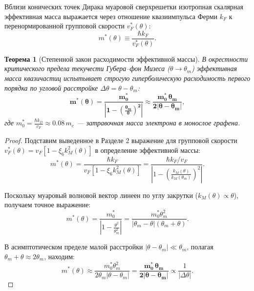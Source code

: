 \documentclass[12pt,a4paper]{article}
\newtheorem{theorem}{Теорема}
\begin{document}
Вблизи конических точек Дирака муаровой сверхрешетки изотропная скалярная эффективная масса выражается через отношение квазиимпульса Ферми $k_F$ к перенормированной групповой скорости $v_F^*(\theta)$:
\begin{equation}
	m^*(\theta) \equiv \frac{\hbar k_F}{v_F^*(\theta)}.
\end{equation}

\begin{theorem}[Степенной закон расходимости эффективной массы]
	В окрестности критического предела текучести Губера--фон Мизеса ($\theta \to \theta_m$) эффективная масса квазичастиц испытывает строгую гиперболическую расходимость первого порядка по угловой расстройке $\Delta \theta = \theta - \theta_m$:
	\begin{equation}
		\mathbf{m^*(\theta) = \frac{m_0^*}{\left| 1 - \left(\frac{\theta_m}{\theta}\right)^2 \right|} \approx \frac{m_0^* \, \theta_m}{2 |\theta - \theta_m|}},
	\end{equation}
	где $m_0^* = \frac{\hbar k_D}{v_F} \approx 0.08 \, m_e$ — затравочная масса электрона в монослое графена.
\end{theorem}

\begin{proof}
	Подставим выведенное в Разделе 2 выражение для групповой скорости $v_F^*(\theta) = v_F [1 - \xi_6 k_M^2(\theta)]$ в определение эффективной массы:
	\begin{equation}
		m^*(\theta) = \frac{\hbar k_F}{v_F \left[ 1 - \xi_6 k_M^2(\theta) \right]} = \frac{\hbar k_F / v_F}{\left| 1 - \left(\frac{k_M(\theta)}{k_M(\theta_m)}\right)^2 \right|}.
	\end{equation}
	
	Поскольку муаровый волновой вектор линеен по углу закрутки ($k_M(\theta) \propto \theta$), получаем точное выражение:
	\begin{equation}
		m^*(\theta) = \frac{m_0^*}{\left| 1 - \frac{\theta^2}{\theta_m^2} \right|} = \frac{m_0^* \theta_m^2}{|\theta_m - \theta|(\theta_m + \theta)}.
	\end{equation}
	
	В асимптотическом пределе малой расстройки $|\theta - \theta_m| \ll \theta_m$, полагая $\theta_m + \theta \approx 2\theta_m$, находим:
	\begin{equation}
		m^*(\theta) \approx \frac{m_0^* \theta_m^2}{2 \theta_m |\theta - \theta_m|} = \mathbf{\frac{m_0^* \, \theta_m}{2 |\theta - \theta_m|}} \propto \frac{1}{|\Delta \theta|}.
	\end{equation}
\end{proof}
\end{document}
